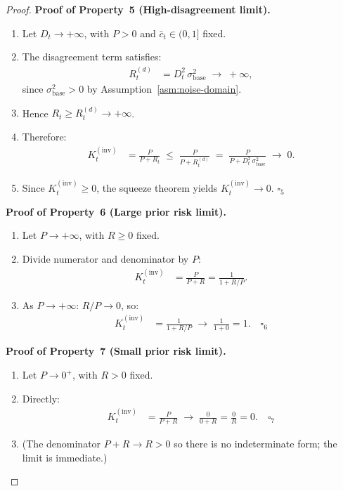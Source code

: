 \documentclass[12pt,openany]{book}
\numberwithin{equation}{chapter}
\theoremstyle{plain}
\theoremstyle{definition}
\theoremstyle{remark}
\begin{document}
\begin{proof}
\medskip
\noindent\textbf{Proof of Property~5
(High-disagreement limit).}
\begin{enumerate}
  \item Let $D_t \to +\infty$, with $P > 0$ and
        $\bar{c}_t \in (0,1]$ fixed.
  \item The disagreement term satisfies:
        \begin{align}
          R_t^{(d)}
          &= D_t^2\,\sigma_{\mathrm{base}}^2
          \;\to\; +\infty,
          \label{eq:proof5-Rd}
        \end{align}
        since $\sigma_{\mathrm{base}}^2 > 0$ by
        Assumption~\ref{asm:noise-domain}.
  \item Hence $R_t \geq R_t^{(d)} \to +\infty$.
  \item Therefore:
        \begin{align}
          K_t^{(\mathrm{inv})}
          &= \frac{P}{P + R_t}
          \;\leq\;
          \frac{P}{P + R_t^{(d)}}
          \;=\;
          \frac{P}{P + D_t^2\,\sigma_{\mathrm{base}}^2}
          \;\to\; 0.
          \label{eq:proof5-K}
        \end{align}
  \item Since $K_t^{(\mathrm{inv})} \geq 0$, the squeeze
        theorem yields $K_t^{(\mathrm{inv})} \to 0$.
        $\square_5$
\end{enumerate}

\medskip
\noindent\textbf{Proof of Property~6
(Large prior risk limit).}
\begin{enumerate}
  \item Let $P \to +\infty$, with $R \geq 0$ fixed.
  \item Divide numerator and denominator by $P$:
        \begin{align}
          K_t^{(\mathrm{inv})}
          &= \frac{P}{P + R}
           = \frac{1}{1 + R/P}.
          \label{eq:proof6-divide}
        \end{align}
  \item As $P \to +\infty$: $R/P \to 0$, so:
        \begin{align}
          K_t^{(\mathrm{inv})}
          &= \frac{1}{1 + R/P}
          \;\to\;
          \frac{1}{1 + 0}
          = 1. \quad \square_6
          \label{eq:proof6-K}
        \end{align}
\end{enumerate}

\medskip
\noindent\textbf{Proof of Property~7
(Small prior risk limit).}
\begin{enumerate}
  \item Let $P \to 0^{+}$, with $R > 0$ fixed.
  \item Directly:
        \begin{align}
          K_t^{(\mathrm{inv})}
          &= \frac{P}{P + R}
          \;\to\;
          \frac{0}{0 + R}
          = \frac{0}{R}
          = 0. \quad \square_7
          \label{eq:proof7-K}
        \end{align}
  \item (The denominator $P + R \to R > 0$ so there is no
        indeterminate form; the limit is immediate.)
\end{enumerate}


\end{proof}
\end{document}
